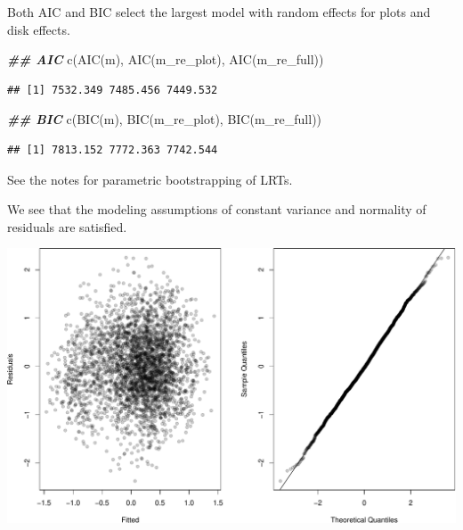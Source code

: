 \documentclass[
  ignorenonframetext,
]{beamer}
\newenvironment{Shaded}{\begin{snugshade}}{\end{snugshade}}
\newcommand{\DocumentationTok}[1]{\textcolor[rgb]{0.56,0.35,0.01}{\textbf{\textit{#1}}}}
\newcommand{\FunctionTok}[1]{\textcolor[rgb]{0.00,0.00,0.00}{#1}}
\newcommand{\NormalTok}[1]{#1}
\begin{document}
\begin{frame}[fragile]{}
\protect\hypertarget{section-16}{}
Both AIC and BIC select the largest model with random effects for plots
and disk effects.

\vspace{12pt}
\small

\begin{Shaded}
\begin{Highlighting}[]
\DocumentationTok{\#\# AIC}
\FunctionTok{c}\NormalTok{(}\FunctionTok{AIC}\NormalTok{(m), }\FunctionTok{AIC}\NormalTok{(m\_re\_plot), }\FunctionTok{AIC}\NormalTok{(m\_re\_full))}
\end{Highlighting}
\end{Shaded}

\begin{verbatim}
## [1] 7532.349 7485.456 7449.532
\end{verbatim}

\begin{Shaded}
\begin{Highlighting}[]
\DocumentationTok{\#\# BIC}
\FunctionTok{c}\NormalTok{(}\FunctionTok{BIC}\NormalTok{(m), }\FunctionTok{BIC}\NormalTok{(m\_re\_plot), }\FunctionTok{BIC}\NormalTok{(m\_re\_full))  }
\end{Highlighting}
\end{Shaded}

\begin{verbatim}
## [1] 7813.152 7772.363 7742.544
\end{verbatim}

\vspace{12pt}
\normalsize

See the notes for parametric bootstrapping of LRTs.
\end{frame}

\begin{frame}{}
\protect\hypertarget{section-17}{}
We see that the modeling assumptions of constant variance and normality
of residuals are satisfied.

\vspace{12pt}

\includegraphics{week11p1_files/figure-beamer/unnamed-chunk-14-1.pdf}
\end{frame}
\end{document}
